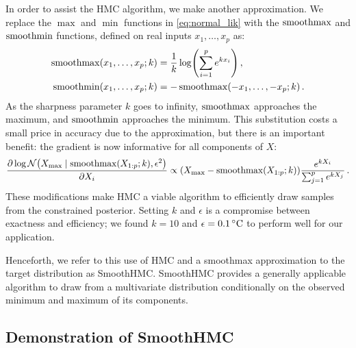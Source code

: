 \documentclass[12pt]{article}
\begin{document}
In order to assist the HMC algorithm, we make another approximation.
We replace the \(\max\) and \(\min\) functions in \autoref{eq:normal_lik} with the \(\operatorname*{smoothmax}\) and \(\operatorname*{smoothmin}\) functions, defined on real inputs \(x_1, \dotsc, x_p\) as:
\begin{equation}
\begin{split}
    \softmax\del{x_1, \dotsc, x_p ; k} &= \frac{1}{k} \log\del{\sum_{i=1}^p e^{kx_i}}\,, \\
    \softmin\del{x_1, \dotsc, x_p ; k} &= -\softmax\del{-x_1, \dotsc, -x_p; k}\,.
\end{split}
\label{eq:softmax}
\end{equation}
As the sharpness parameter \(k\) goes to infinity, \(\operatorname*{smoothmax}\) approaches the maximum, and \(\operatorname*{smoothmin}\) approaches the minimum.
This substitution costs a small price in accuracy due to the approximation, but there is an important benefit: the gradient is now informative for all components of \(X\):
\begin{equation}
\frac{\partial \log \normal\del{\Xmax \mid \softmax\del{X_{1:p} ; k}, \epsilon^2}}{\partial X_i} \propto \del{\Xmax - \softmax\del{X_{1:p} ; k}} 
        \frac{e^{k X_i}}
             {\sum_{j=1}^p e^{k X_j}} \,.
\end{equation}
These modifications make HMC a viable algorithm to efficiently draw samples from the constrained posterior.
Setting \(k\) and \(\epsilon\) is a compromise between exactness and efficiency;
we found \(k=10\) and \(\epsilon=0.1\,{}^{\circ}\mathrm{C}\) to perform well for our application.

Henceforth, we refer to this use of HMC and a smoothmax approximation to the target distribution as SmoothHMC.
SmoothHMC provides a generally applicable algorithm to draw from a multivariate distribution conditionally on the observed minimum and maximum of its components.

\subsection{Demonstration of SmoothHMC}
\label{sec:toy_example}
\end{document}
